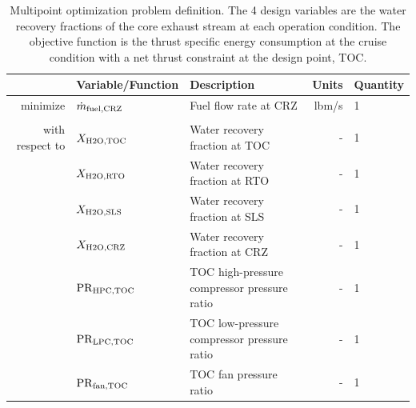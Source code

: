 \documentclass[conf]{new-aiaa}
\begin{document}
\begin{table}[hbt!]
    \centering
    \caption{
        Multipoint optimization problem definition.
        The 4 design variables are the water recovery fractions of the core exhaust stream at each operation condition.
        The objective function is the thrust specific energy consumption at the cruise condition with a net thrust constraint at the design point, TOC.
    }
    \small
    \renewcommand{\arraystretch}{1.2}
    \begin{tabular}{r l l r l}
        \toprule
                        & Variable/Function              & Description                                 & Units          & Quantity \\
        \hline
        minimize        & $ \dot{m}_{\rm{fuel,CRZ}} $    & Fuel flow rate at CRZ                       & \si{lbm/s}     & 1        \\
                        &                                &                                             &                &          \\
        with respect to & $X_{\rm{H2O,TOC}}$             & Water recovery fraction at TOC              & -              & 1        \\
                        & $X_{\rm{H2O,RTO}}$             & Water recovery fraction at RTO              & -              & 1        \\
                        & $X_{\rm{H2O,SLS}}$             & Water recovery fraction at SLS              & -              & 1        \\
                        & $X_{\rm{H2O,CRZ}}$             & Water recovery fraction at CRZ              & -              & 1        \\
                        & $\rm{PR}_{\rm{HPC,TOC}}$       & TOC high-pressure compressor pressure ratio & -              & 1        \\
                        & $\rm{PR}_{\rm{LPC,TOC}}$       & TOC low-pressure compressor pressure ratio  & -              & 1        \\
                        & $\rm{PR}_{\rm{fan,TOC}}$       & TOC fan pressure ratio                      & -              & 1        \\

\end{tabular}
\end{table}
\end{document}
